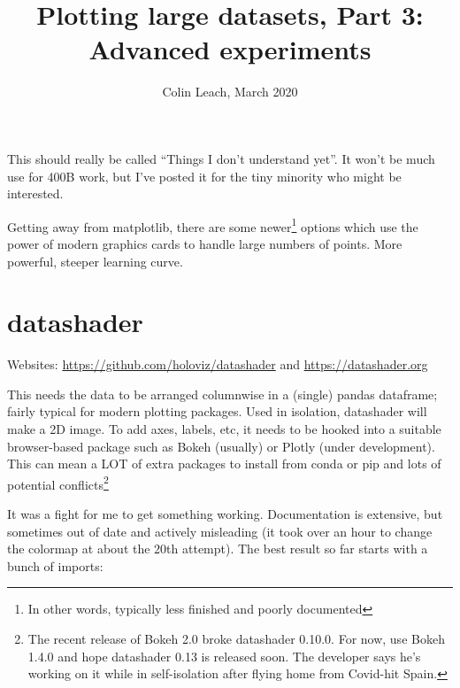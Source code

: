 

\setlength{\parskip}{0.2em}
\setlength{\skip\footins}{20pt}

\title{Plotting large datasets, Part 3: Advanced experiments}
\author{Colin Leach, March 2020}
\date{\vspace{-3ex}}



	
\maketitle

This should really be called ``Things I don't understand yet''. It won't be much use for 400B work, but I've posted it for the tiny minority who might be interested.

Getting away from matplotlib, there are some newer\footnote{In other words, typically less finished and poorly documented} options which use the power of modern graphics cards to handle large numbers of points. More powerful, steeper learning curve.

\section{datashader}

Websites: \url{https://github.com/holoviz/datashader} and \url{https://datashader.org}

This needs the data to be arranged columnwise in a (single) pandas dataframe; fairly typical for modern plotting packages. Used in isolation, datashader will make a 2D image. To add axes, labels, etc, it needs to be hooked into a suitable browser-based package such as Bokeh (usually) or Plotly (under development). This can mean a LOT of extra packages to install from conda or pip and lots of potential conflicts\footnote{The recent release of Bokeh 2.0 broke datashader 0.10.0. For now, use Bokeh 1.4.0 and hope datashader 0.13 is released soon. The developer says he's working on it while in self-isolation after flying home from Covid-hit Spain.}

It was a fight for me to get something working. Documentation is extensive, but sometimes out of date and actively misleading (it took over an hour to change the colormap at about the 20th attempt).
The best result so far starts with a bunch of imports:


